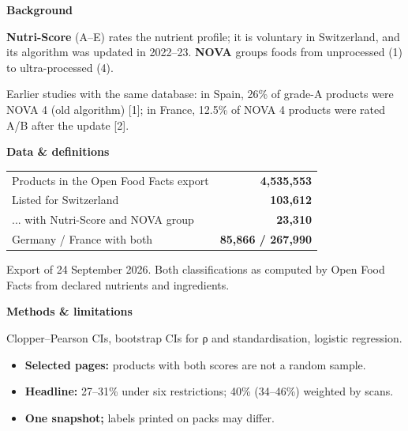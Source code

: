 \documentclass{article}
\newcommand{\Small}{\fontsize{15.5}{20}\selectfont\color{ink2}}
\newcommand{\Head}{\fontsize{26}{30}\selectfont\bfseries}
\newcommand{\panelhead}[1]{{\Head #1}\par\vspace{2pt}{\color{rule}\rule{\linewidth}{1.2pt}}\par\vspace{3pt}}
\begin{document}
\vspace{15pt}
\begin{tcbraster}[raster columns=3,raster equal height,raster column skip=18pt,raster every box/.style={fontupper=\fontsize{17.5}{22.5}\selectfont}]
\begin{tcolorbox}[panel]
\panelhead{Background}
\textbf{Nutri-Score} (A--E) rates the nutrient profile; it is voluntary in Switzerland, and its algorithm was updated in 2022--23. \textbf{NOVA} groups foods from unprocessed (1) to ultra-processed (4).\par\vspace{7pt}
Earlier studies with the same database: in Spain, 26\% of grade-A products were NOVA 4 (old algorithm) [1]; in France, 12.5\% of NOVA 4 products were rated A/B after the update [2].
\end{tcolorbox}
\begin{tcolorbox}[panel]
\panelhead{Data \& definitions}
{\Small
\begin{tabularx}{\linewidth}{@{}X r@{}}
Products in the Open Food Facts export & \textbf{\color{ink}4,535,553}\\
Listed for Switzerland & \textbf{\color{ink}103,612}\\
... with Nutri-Score and NOVA group & \textbf{\color{ink}23,310}\\
Germany / France with both & \textbf{\color{ink}85,866 / 267,990}\\
\bottomrule
\end{tabularx}\par}\vspace{4pt}
Export of 24 September 2026. Both classifications as computed by Open Food Facts from declared nutrients and ingredients.
\end{tcolorbox}
\begin{tcolorbox}[panel]
\panelhead{Methods \& limitations}
Clopper--Pearson CIs, bootstrap CIs for ρ and standardisation, logistic regression.\par\vspace{2pt}
\begin{itemize}
\item \textbf{Selected pages:} products with both scores are not a random sample.
\item \textbf{Headline:} 27--31\% under six restrictions; 40\% (34--46\%) weighted by scans.
\item \textbf{One snapshot;} labels printed on packs may differ.
\end{itemize}
\end{tcolorbox}
\end{tcbraster}
\end{document}
